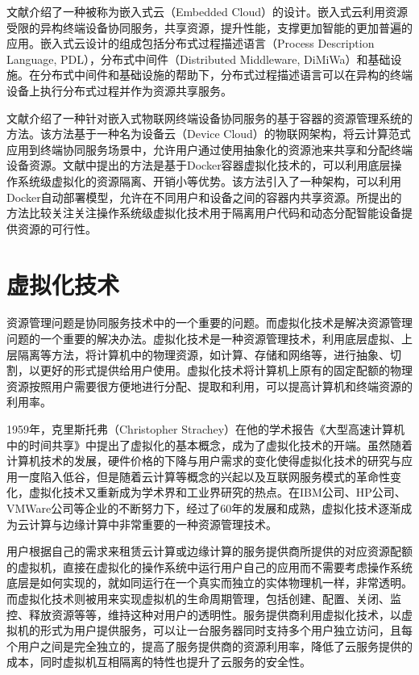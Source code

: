 文献\cite{laukkarinen2013embedded}介绍了一种被称为嵌入式云（Embedded Cloud）的设计。嵌入式云利用资源受限的异构终端设备协同服务，共享资源，提升性能，支撑更加智能的更加普遍的应用。嵌入式云设计的组成包括分布式过程描述语言（Process Description Language, PDL），分布式中间件（Distributed Middleware, DiMiWa）和基础设施。在分布式中间件和基础设施的帮助下，分布式过程描述语言可以在异构的终端设备上执行分布式过程并作为资源共享服务。

文献\cite{renner2016towards}介绍了一种针对嵌入式物联网终端设备协同服务的基于容器的资源管理系统的方法。该方法基于一种名为设备云（Device Cloud）的物联网架构，将云计算范式应用到终端协同服务场景中，允许用户通过使用抽象化的资源池来共享和分配终端设备资源。文献中提出的方法是基于Docker容器虚拟化技术的，可以利用底层操作系统级虚拟化的资源隔离、开销小等优势。该方法引入了一种架构，可以利用Docker自动部署模型，允许在不同用户和设备之间的容器内共享资源。所提出的方法比较关注关注操作系统级虚拟化技术用于隔离用户代码和动态分配智能设备提供资源的可行性。



\section{虚拟化技术}\label{sec:related_work_virtualization}
资源管理问题是协同服务技术中的一个重要的问题\citep{文雨2013面向应用服务级目标的虚拟化资源管理}。而虚拟化技术是解决资源管理问题的一个重要的解决办法。虚拟化技术是一种资源管理技术，利用底层虚拟、上层隔离等方法，将计算机中的物理资源，如计算、存储和网络等，进行抽象、切割，以更好的形式提供给用户使用\cite{goth2007virtualization}。虚拟化技术将计算机上原有的固定配额的物理资源按照用户需要很方便地进行分配、提取和利用，可以提高计算机和终端资源的利用率。

1959年，克里斯托弗（Christopher Strachey）在他的学术报告《大型高速计算机中的时间共享》中提出了虚拟化的基本概念，成为了虚拟化技术的开端\citep{本刊编辑部2017虚拟化概述}。虽然随着计算机技术的发展，硬件价格的下降与用户需求的变化使得虚拟化技术的研究与应用一度陷入低谷，但是随着云计算等概念的兴起以及互联网服务模式的革命性变化，虚拟化技术又重新成为学术界和工业界研究的热点\cite{menasce2005virtualization}。在IBM公司、HP公司、VMWare公司等企业的不断努力下，经过了60年的发展和成熟，虚拟化技术逐渐成为云计算与边缘计算中非常重要的一种资源管理技术\cite{pearce2013virtualization,kumar2014review}。

用户根据自己的需求来租赁云计算或边缘计算的服务提供商所提供的对应资源配额的虚拟机，直接在虚拟化的操作系统中运行用户自己的应用而不需要考虑操作系统底层是如何实现的，就如同运行在一个真实而独立的实体物理机一样，非常透明\cite{叶蔚2019基于虚拟化的}。而虚拟化技术则被用来实现虚拟机的生命周期管理，包括创建、配置、关闭、监控、释放资源等等，维持这种对用户的透明性。服务提供商利用虚拟化技术，以虚拟机的形式为用户提供服务，可以让一台服务器同时支持多个用户独立访问，且每个用户之间是完全独立的，提高了服务提供商的资源利用率，降低了云服务提供的成本，同时虚拟机互相隔离的特性也提升了云服务的安全性。

